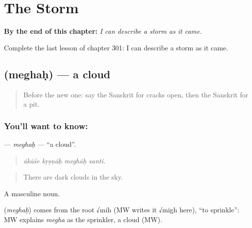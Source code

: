 
\chapter{The Storm}
\label{ch:sa-the-storm}

\begin{chapteropening}
\textbf{By the end of this chapter:} \emph{I can describe a storm as it came.}

Complete the last lesson of chapter 301: I can describe a storm as it came.
\end{chapteropening}

\section[\texorpdfstring{\sk{मेघः} (meghaḥ)}{मेघः (meghaḥ)}]{ (meghaḥ) — a cloud}

\label{lesson:SA-C301-meghah}



\begin{quote}
Before the new one: say the Sanskrit for cracks open, then the Sanskrit for a pit.
\end{quote}

\subsection*{You'll want to know: }
\textbf{} — \emph{meghaḥ} — \textquotedblleft{}a cloud\textquotedblright{}.

\begin{quote}
   
\end{quote}

\begin{quote}
\emph{ākāśe kṛṣṇāḥ meghāḥ santi.}
\end{quote}

\begin{quote}
There are dark clouds in the sky.
\end{quote}

A masculine noun.

\begin{cousinweb}
\textbf{} (\emph{meghaḥ}) comes from the root √mih (MW writes it √migh here), \textquotedblleft{}to sprinkle\textquotedblright{}: MW explains \emph{megha} as the sprinkler, a cloud (MW).
\end{cousinweb}

